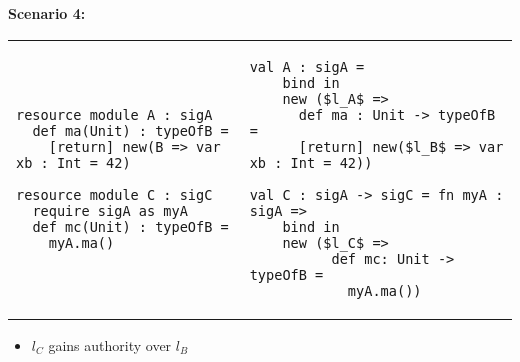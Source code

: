 \documentclass{llncs}
\begin{document}
\newpage

\noindent\underline{}

\vspace{10pt}

\noindent\textbf{Scenario 4:}

\begin{tabular}{p{}p{}}
\begin{minipage}[t]{\textwidth}
\begin{lstlisting}
resource module A : sigA
  def ma(Unit) : typeOfB =
    [return] new(B => var xb : Int = 42)
    
resource module C : sigC
  require sigA as myA
  def mc(Unit) : typeOfB =
    myA.ma()
\end{lstlisting}
\end{minipage}
&
\hspace{-10ex}
\begin{minipage}[t]{\textwidth}
\begin{lstlisting}
val A : sigA =
    bind in
    new ($l_A$ =>
      def ma : Unit -> typeOfB =
      [return] new($l_B$ => var xb : Int = 42))

val C : sigA -> sigC = fn myA : sigA =>
    bind in
    new ($l_C$ =>
          def mc: Unit -> typeOfB =
            myA.ma())
\end{lstlisting}
\end{minipage}
\end{tabular}

\begin{itemize}
\item $l_C$ gains authority over $l_B$
\end{itemize}



\end{document}
